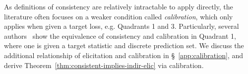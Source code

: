 \documentclass[11pt]{article} %
\begin{document}
As definitions of consistency are relatively intractable to apply directly, the literature often focuses on a weaker condition called \emph{calibration}, which only applies when given a target loss, e.g. Quadrants 1 and 3. 
Particularly, several authors~\citep{zhang2004statistical, lin2004note,bartlett2006convexity,tewari2007consistency,ramaswamy2016convex} show the equivalence of consistency and calibration in Quadrant 1, where one is given a target statistic and discrete prediction set.
We discuss the additional relationship of elicitation and calibration in \S~\ref{app:calibration}, and derive Theorem~\ref{thm:consistent-implies-indir-elic} via calibration.


\end{document}
